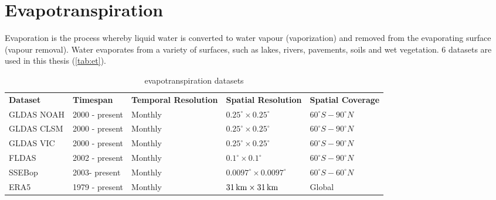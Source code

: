 \section{Evapotranspiration}
Evaporation is the process whereby liquid water is converted to water vapour (vaporization) and removed from the evaporating surface (vapour removal). Water evaporates from a variety of surfaces, such as lakes, rivers, pavements, soils and wet vegetation. 6 datasets are used in this thesis (\autoref{tab:et}). 
\begin{table}[htbp]\centering 
	\begin{tabular}{lllll}
		&                                     &                                          &                                         &                                       \\ \hline
		\multicolumn{1}{|l|}{\textbf{Dataset}}    & \multicolumn{1}{l|}{\textbf{Timespan}}       & \multicolumn{1}{l|}{\textbf{Temporal Resolution}} & \multicolumn{1}{l|}{\textbf{Spatial Resolution}} & \multicolumn{1}{l|}{\textbf{Spatial Coverage}} \\ \hline
		\multicolumn{1}{|l|}{GLDAS NOAH} & \multicolumn{1}{l|}{2000 - present} & \multicolumn{1}{l|}{Monthly}             & \multicolumn{1}{l|}{$0.25^{\circ} \times  0.25^{\circ}$}        & \multicolumn{1}{l|}{$60^{\circ}S - 90^{\circ}N$}      \\ \hline
		\multicolumn{1}{|l|}{GLDAS CLSM} & \multicolumn{1}{l|}{2000 - present} & \multicolumn{1}{l|}{Monthly}             & \multicolumn{1}{l|}{$0.25^{\circ} \times 0.25^{\circ}$}        & \multicolumn{1}{l|}{$60^{\circ}S - 90^{\circ}N$}      \\ \hline
		\multicolumn{1}{|l|}{GLDAS VIC}  & \multicolumn{1}{l|}{2000 - present} & \multicolumn{1}{l|}{Monthly}             & \multicolumn{1}{l|}{$0.25^{\circ} \times 0.25^{\circ}$}        & \multicolumn{1}{l|}{$60^{\circ}S - 90^{\circ}N$}      \\ \hline
		\multicolumn{1}{|l|}{FLDAS}      & \multicolumn{1}{l|}{2002 - present} & \multicolumn{1}{l|}{Monthly}             & \multicolumn{1}{l|}{$0.1^{\circ} \times 0.1^{\circ}$}          & \multicolumn{1}{l|}{$60^{\circ}S - 90^{\circ}N$}      \\ \hline
		\multicolumn{1}{|l|}{SSEBop}     & \multicolumn{1}{l|}{2003- present}  & \multicolumn{1}{l|}{Monthly}             & \multicolumn{1}{l|}{$0.0097^{\circ} \times 0.0097^{\circ}$}    & \multicolumn{1}{l|}{$60^{\circ}S - 60^{\circ}N$}      \\ \hline
		\multicolumn{1}{|l|}{ERA5}       & \multicolumn{1}{l|}{1979 - present} & \multicolumn{1}{l|}{Monthly}             & \multicolumn{1}{l|}{$31\,\mathrm{km} \times 31\,\mathrm{km}$}            & \multicolumn{1}{l|}{Global}           \\ \hline
	\end{tabular}
	\caption{evapotranspiration datasets}
	\label{tab:et}
\end{table}
